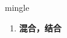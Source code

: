 
\begin{frame}
{\huge mingle}
\begin{center}
\begin{enumerate}\Large
  \item \textbf{混合，结合}
\end{enumerate}
\end{center}
\end{frame}

